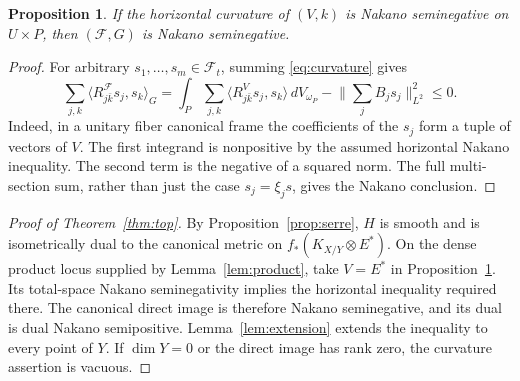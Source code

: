 \documentclass[11pt,reqno]{amsart}
\numberwithin{equation}{section}
\newtheorem{proposition}[theorem]{Proposition}
\theoremstyle{definition}
\theoremstyle{remark}
\newcommand{\cF}{\mathcal F}
\newcommand{\dV}{\,dV}
\newcommand{\ip}[2]{\langle #1,#2\rangle}
\newcommand{\norm}[1]{\lVert #1\rVert}
\begin{document}
\begin{proposition}\label{prop:negative-product}
If the horizontal curvature of $(V,k)$ is Nakano seminegative on $U\times P$, then $(\cF,G)$ is Nakano seminegative.
\end{proposition}
\begin{proof}
For arbitrary $s_1,\ldots,s_m\in\cF_t$, summing \eqref{eq:curvature} gives
\begin{equation}\label{eq:nakano-curvature}
 \sum_{j,k}\ip{R^{\cF}_{j\bar k}s_j}{s_k}_G
 =\int_P\sum_{j,k}\ip{R^V_{j\bar k}s_j}{s_k}\dV_{\omega_P}
   -\norm{\sum_j B_js_j}_{L^2}^2\leq0.
\end{equation}
Indeed, in a unitary fiber canonical frame the coefficients of the $s_j$ form a tuple of vectors of $V$. The first integrand is nonpositive by the assumed horizontal Nakano inequality. The second term is the negative of a squared norm. The full multi-section sum, rather than just the case $s_j=\xi_js$, gives the Nakano conclusion.
\end{proof}


\begin{proof}[Proof of Theorem~\ref{thm:top}]
By Proposition~\ref{prop:serre}, $H$ is smooth and is isometrically dual to the canonical metric on $f_*(K_{X/Y}\otimes E^*)$. On the dense product locus supplied by Lemma~\ref{lem:product}, take $V=E^*$ in Proposition~\ref{prop:negative-product}. Its total-space Nakano seminegativity implies the horizontal inequality required there. The canonical direct image is therefore Nakano seminegative, and its dual is dual Nakano semipositive. Lemma~\ref{lem:extension} extends the inequality to every point of $Y$. If $\dim Y=0$ or the direct image has rank zero, the curvature assertion is vacuous.
\end{proof}
\end{document}
